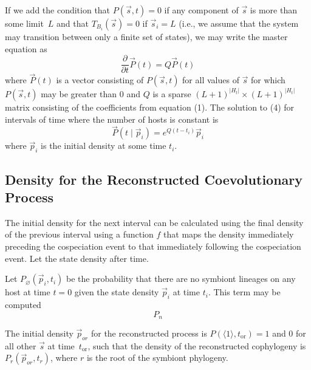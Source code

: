 \documentclass{article}
\begin{document}
            If we add the condition that $P\left(\vec{s},t\right) = 0$ if any
            component of $\vec{s}$ is more than some limit~$L$ and that
            $T_{B_i}\left(\vec{s}\right) = 0$ if $\vec{s}_i = L$ (i.e., we
            assume that the system may transition between only a finite set of
            states), we may write the master equation as
            \begin{equation}
                \frac{\partial}{\partial t} \vec{P}\left(t\right) =
                Q\vec{P}\left(t\right)
            \end{equation}
            where $\vec{P}\left(t\right)$ is a vector consisting of
            $P\left(\vec{s}, t\right)$ for all values of $\vec{s}$ for which
            $P\left(\vec{s}, t\right)$ may be greater than 0 and $Q$ is a
            sparse $(L+1)^{\lvert{H_t}\rvert} \times (L+1)^{\lvert{H_t}\rvert}$
            matrix consisting of the coefficients from equation (1). The
            solution to (4) for intervals of time where the number of hosts is
            constant is
            \begin{equation}
                \vec{P}\left(t\mid\vec{p}_i\right) =
                e^{Q\left(t-t_i\right)}\vec{p}_i
            \end{equation}
            where $\vec{p}_i$ is the initial density at some time $t_i$.

        \subsection*{Density for the Reconstructed Coevolutionary Process}

            The initial density for the next interval can be calculated using
            the final density of the previous interval using a function
            $f$ that maps the density immediately preceding the cospeciation
            event to that immediately following the cospeciation event. Let the
            state density after time.

            Let $P_\varnothing\left(\vec{p}_i, t_i\right)$ be the probability
            that there are no symbiont lineages on any host at time $t = 0$
            given the state density $\vec{p}_i$ at time $t_i$. This term may be
            computed
            \begin{equation}
                P_n
            \end{equation}

            The initial density $\vec{p}_{or}$ for the reconstructed process is
            $P\left(\langle1\rangle, t_\text{or}\right) = 1$ and 0 for all
            other $\vec{s}$ at time~$t_\text{or}$, such that the density of the
            reconstructed cophylogeny is $P_r\left(\vec{p}_{or},
            t_{r}\right)$, where $r$ is the root of the symbiont phylogeny.
\end{document}
